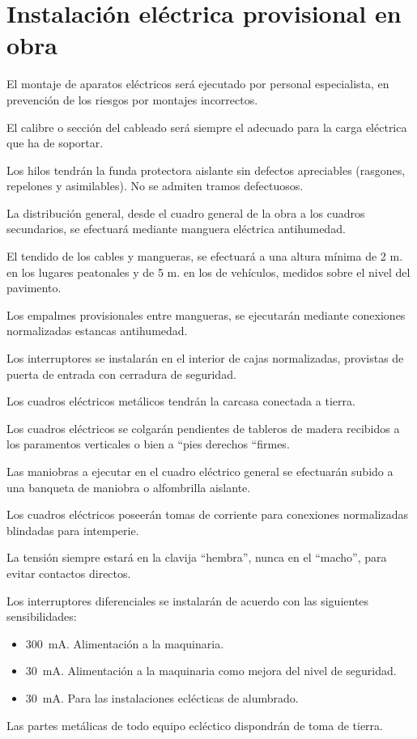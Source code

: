 \section{Instalación eléctrica provisional en obra}
\label{sec:sys-instalacion}
El montaje de aparatos eléctricos será ejecutado por personal especialista, en prevención de los riesgos por montajes incorrectos.
	
El calibre o sección del cableado será siempre el adecuado para la carga eléctrica que ha de soportar.

Los hilos tendrán la funda protectora aislante sin defectos apreciables (rasgones, repelones y asimilables). No se admiten tramos defectuosos.

La distribución general, desde el cuadro general de la obra a los cuadros secundarios, se efectuará mediante manguera eléctrica antihumedad.

El tendido de los cables y mangueras, se efectuará a una altura mínima de 2 m. en los lugares peatonales y de 5 m. en los de vehículos, medidos sobre el nivel del pavimento.

Los empalmes provisionales entre mangueras, se ejecutarán mediante conexiones normalizadas estancas antihumedad.

Los interruptores se instalarán en el interior de cajas normalizadas, provistas de puerta de entrada con cerradura de seguridad.

Los cuadros eléctricos metálicos tendrán la carcasa conectada a tierra.

Los cuadros eléctricos se colgarán pendientes de tableros de madera recibidos a los paramentos verticales o bien a “pies derechos “firmes.

Las maniobras a ejecutar en el cuadro eléctrico general se efectuarán subido a una banqueta de maniobra o alfombrilla aislante.

Los cuadros eléctricos poseerán tomas de corriente para conexiones normalizadas blindadas para intemperie.

La tensión siempre estará en la clavija “hembra”, nunca en el “macho”, para evitar contactos directos.

Los interruptores diferenciales se instalarán de acuerdo con las siguientes sensibilidades:
\begin{itemize}[label=--]
    \item\SI{300}{\milli\ampere}. Alimentación a la maquinaria.
    \item\SI{30}{\milli\ampere}. Alimentación a la maquinaria como mejora del nivel de seguridad.
    \item\SI{30}{\milli\ampere}. Para las instalaciones eclécticas de alumbrado.
\end{itemize}
Las partes metálicas de todo equipo ecléctico dispondrán de toma de tierra.

